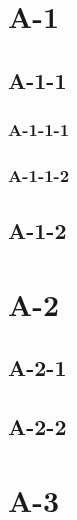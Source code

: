 \documentclass[
  class=book,
]{../code/ztex}
\begin{document}
\ztexptoc[1]

\dotfill\par
\chapter{A-1}
\ztexptoc[2]

\section{A-1-1}
\subsection{A-1-1-1}
\subsection{A-1-1-2}
\section{A-1-2}

\chapter{A-2}
\section{A-2-1}
\section{A-2-2}
\chapter{A-3}



\end{document}
